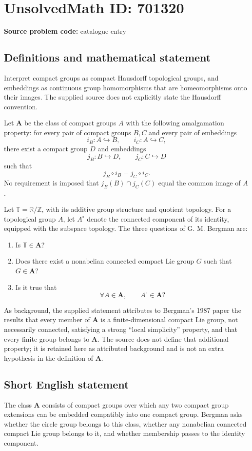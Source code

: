 \documentclass[11pt]{article}
\newcommand{\Z}{\mathbb{Z}}
\newcommand{\R}{\mathbb{R}}
\begin{document}
\section*{UnsolvedMath ID: 701320}
\textbf{Source problem code:} catalogue entry
\subsection{Definitions and mathematical statement}
Interpret compact groups as compact Hausdorff topological groups, and embeddings as continuous group homomorphisms that are homeomorphisms onto their images. The supplied source does not explicitly state the Hausdorff convention.

Let \(\mathbf{A}\) be the class of compact groups \(A\) with the following amalgamation property: for every pair of compact groups \(B,C\) and every pair of embeddings
\[
i_B:A\hookrightarrow B,\qquad i_C:A\hookrightarrow C,
\]
there exist a compact group \(D\) and embeddings
\[
j_B:B\hookrightarrow D,\qquad j_C:C\hookrightarrow D
\]
such that
\[
j_B\circ i_B=j_C\circ i_C.
\]
No requirement is imposed that \(j_B(B)\cap j_C(C)\) equal the common image of \(A\).

Let \(\mathbb{T}=\R/\Z\), with its additive group structure and quotient topology. For a topological group \(A\), let \(A^{\circ}\) denote the connected component of its identity, equipped with the subspace topology. The three questions of G. M. Bergman are:
\begin{enumerate}
\item[(a)] Is \(\mathbb{T}\in\mathbf{A}\)?
\item[(b)] Does there exist a nonabelian connected compact Lie group \(G\) such that \(G\in\mathbf{A}\)?
\item[(c)] Is it true that
\[
\forall A\in\mathbf{A},\qquad A^{\circ}\in\mathbf{A}?
\]
\end{enumerate}

As background, the supplied statement attributes to Bergman's 1987 paper the results that every member of \(\mathbf{A}\) is a finite-dimensional compact Lie group, not necessarily connected, satisfying a strong ``local simplicity'' property, and that every finite group belongs to \(\mathbf{A}\). The source does not define that additional property; it is retained here as attributed background and is not an extra hypothesis in the definition of \(\mathbf{A}\).
\subsection{Short English statement}
The class \(\mathbf{A}\) consists of compact groups over which any two compact group extensions can be embedded compatibly into one compact group. Bergman asks whether the circle group belongs to this class, whether any nonabelian connected compact Lie group belongs to it, and whether membership passes to the identity component.
\end{document}
